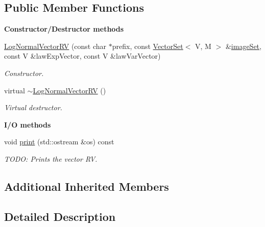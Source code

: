 \subsection*{Public Member Functions}
\begin{Indent}{\bf Constructor/\-Destructor methods}\par
\begin{DoxyCompactItemize}
\item 
\hyperlink{class_q_u_e_s_o_1_1_log_normal_vector_r_v_ae2fa33feed7a961777ff4122353d77d1}{Log\-Normal\-Vector\-R\-V} (const char $\ast$prefix, const \hyperlink{class_q_u_e_s_o_1_1_vector_set}{Vector\-Set}$<$ V, M $>$ \&\hyperlink{class_q_u_e_s_o_1_1_base_vector_r_v_aa4dd2f036228eac1f945bacc7147a922}{image\-Set}, const V \&law\-Exp\-Vector, const V \&law\-Var\-Vector)
\begin{DoxyCompactList}\small\item\em Constructor. \end{DoxyCompactList}\item 
virtual \hyperlink{class_q_u_e_s_o_1_1_log_normal_vector_r_v_a821437ffc879715f63f5b6628877bb98}{$\sim$\-Log\-Normal\-Vector\-R\-V} ()
\begin{DoxyCompactList}\small\item\em Virtual destructor. \end{DoxyCompactList}\end{DoxyCompactItemize}
\end{Indent}
\begin{Indent}{\bf I/\-O methods}\par
\begin{DoxyCompactItemize}
\item 
void \hyperlink{class_q_u_e_s_o_1_1_log_normal_vector_r_v_a150a212058169e2b708e82c8faff61eb}{print} (std\-::ostream \&os) const 
\begin{DoxyCompactList}\small\item\em T\-O\-D\-O\-: Prints the vector R\-V. \end{DoxyCompactList}\end{DoxyCompactItemize}
\end{Indent}
\subsection*{Additional Inherited Members}


\subsection{Detailed Description}
